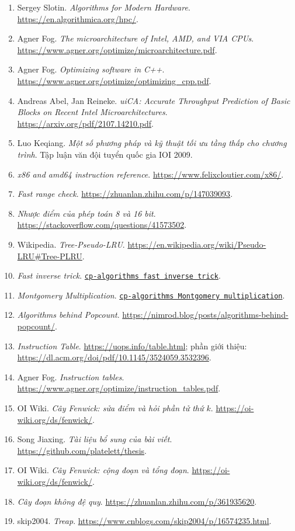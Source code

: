 \documentclass[11pt]{article}
\begin{document}
\begin{enumerate}
  \item Sergey Slotin. \emph{Algorithms for Modern Hardware}.
  \url{https://en.algorithmica.org/hpc/}.
  \item Agner Fog. \emph{The microarchitecture of Intel, AMD, and VIA CPUs}.
  \url{https://www.agner.org/optimize/microarchitecture.pdf}.
  \item Agner Fog. \emph{Optimizing software in C++}.
  \url{https://www.agner.org/optimize/optimizing_cpp.pdf}.
  \item Andreas Abel, Jan Reineke. \emph{uiCA: Accurate Throughput Prediction
  of Basic Blocks on Recent Intel Microarchitectures}.
  \url{https://arxiv.org/pdf/2107.14210.pdf}.
  \item Luo Keqiang. \emph{Một số phương pháp và kỹ thuật tối ưu tầng thấp cho
  chương trình}. Tập luận văn đội tuyển quốc gia IOI 2009.
  \item \emph{x86 and amd64 instruction reference}.
  \url{https://www.felixcloutier.com/x86/}.
  \item \emph{Fast range check}. \url{https://zhuanlan.zhihu.com/p/147039093}.
  \item \emph{Nhược điểm của phép toán 8 và 16 bit}.
  \url{https://stackoverflow.com/questions/41573502}.
  \item Wikipedia. \emph{Tree-Pseudo-LRU}.
  \url{https://en.wikipedia.org/wiki/Pseudo-LRU#Tree-PLRU}.
  \item \emph{Fast inverse trick}.
  \href{https://cp-algorithms.com/algebra/montgomery_multiplication.html#fast-inverse-trick}{\texttt{cp-algorithms fast inverse trick}}.
  \item \emph{Montgomery Multiplication}.
  \href{https://cp-algorithms.com/algebra/montgomery_multiplication.html}{\texttt{cp-algorithms Montgomery multiplication}}.
  \item \emph{Algorithms behind Popcount}.
  \url{https://nimrod.blog/posts/algorithms-behind-popcount/}.
  \item \emph{Instruction Table}. \url{https://uops.info/table.html};
  phần giới thiệu:
  \url{https://dl.acm.org/doi/pdf/10.1145/3524059.3532396}.
  \item Agner Fog. \emph{Instruction tables}.
  \url{https://www.agner.org/optimize/instruction_tables.pdf}.
  \item OI Wiki. \emph{Cây Fenwick: sửa điểm và hỏi phần tử thứ \(k\)}.
  \url{https://oi-wiki.org/ds/fenwick/}.
  \item Song Jiaxing. \emph{Tài liệu bổ sung của bài viết}.
  \url{https://github.com/platelett/thesis}.
  \item OI Wiki. \emph{Cây Fenwick: cộng đoạn và tổng đoạn}.
  \url{https://oi-wiki.org/ds/fenwick/}.
  \item \emph{Cây đoạn không đệ quy}.
  \url{https://zhuanlan.zhihu.com/p/361935620}.
  \item skip2004. \emph{Treap}.
  \url{https://www.cnblogs.com/skip2004/p/16574235.html}.
\end{enumerate}
\end{document}
